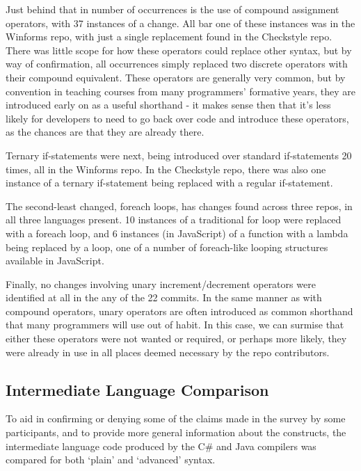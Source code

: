 \documentclass{article}
\begin{document}
        Just behind that in number of occurrences is the use of compound assignment operators, with 37 instances of a change. All bar one of these instances was in the Winforms repo, with just a single replacement found in the Checkstyle repo. There was little scope for how these operators could replace other syntax, but by way of confirmation, all occurrences simply replaced two discrete operators with their compound equivalent. These operators are generally very common, but by convention in teaching courses from many programmers' formative years, they are introduced early on as a useful shorthand - it makes sense then that it's less likely for developers to need to go back over code and introduce these operators, as the chances are that they are already there.

        Ternary if-statements were next, being introduced over standard if-statements 20 times, all in the Winforms repo. In the Checkstyle repo, there was also one instance of a ternary if-statement being replaced with a regular if-statement.

        The second-least changed, foreach loops, has changes found across three repos, in all three languages present. 10 instances of a traditional for loop were replaced with a foreach loop, and 6 instances (in JavaScript) of a  function with a lambda being replaced by a  loop, one of a number of foreach-like looping structures available in JavaScript.

        Finally, no changes involving unary increment/decrement operators were identified at all in the any of the 22 commits. In the same manner as with compound operators, unary operators are often introduced as common shorthand that many programmers will use out of habit. In this case, we can surmise that either these operators were not wanted or required, or perhaps more likely, they were already in use in all places deemed necessary by the repo contributors.

    \subsection{Intermediate Language Comparison}
    \label{subsec:ilComp}
        To aid in confirming or denying some of the claims made in the survey by some participants, and to provide more general information about the constructs, the intermediate language code produced by the C\# and Java compilers was compared for both `plain' and `advanced' syntax.
\end{document}
